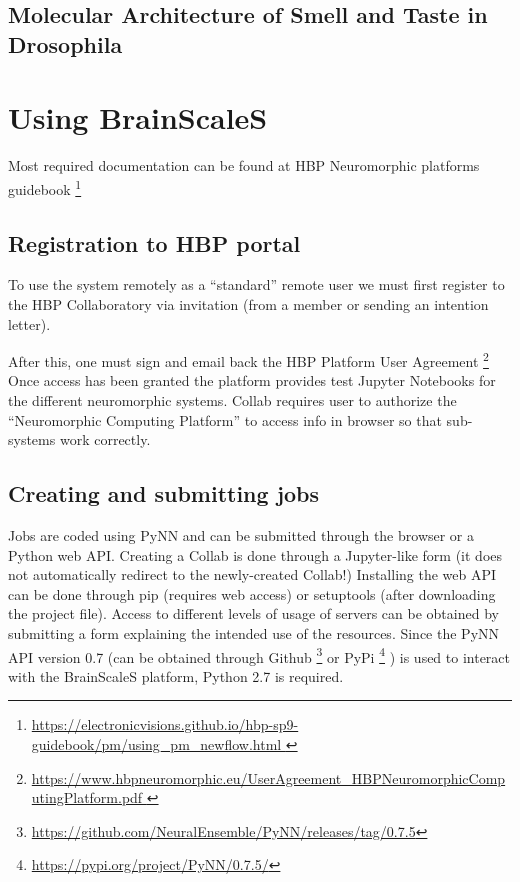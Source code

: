 \documentclass[11pt,a4paper]{article}
\begin{document}
   \subsection{Molecular Architecture of Smell and Taste in Drosophila}



  \section{Using BrainScaleS}
 
  Most required documentation can be found at HBP Neuromorphic platforms guidebook
    \footnote{
    \url{
      https://electronicvisions.github.io/hbp-sp9-guidebook/pm/using_pm_newflow.html
    }
  }
 
  \subsection{Registration to HBP portal}
  To use the system remotely as a ``standard'' remote user we must first register to the HBP Collaboratory via invitation (from a member or sending an intention letter).
 
  After this, one must sign and email back the HBP Platform User  Agreement
  \footnote{
    \url{
      https://www.hbpneuromorphic.eu/UserAgreement_HBPNeuromorphicComputingPlatform.pdf
    }
  }
  Once access has been granted the platform provides test Jupyter Notebooks for the different neuromorphic systems. 
  Collab requires user to authorize the ``Neuromorphic Computing Platform'' to access info in browser so that sub-systems work correctly.
 
  \subsection{Creating and submitting jobs}
  Jobs are coded using PyNN and can be submitted through the browser or a Python web API.
  Creating a Collab is done through a Jupyter-like form (it does not automatically redirect to the newly-created Collab!)
  Installing the web API can be done through pip (requires web access) or setuptools (after downloading the project file).
  Access to different levels of usage of servers can be obtained by submitting a form explaining the intended use of the resources.
  Since the PyNN API version 0.7 (can be obtained through Github
    \footnote{\url{https://github.com/NeuralEnsemble/PyNN/releases/tag/0.7.5}} 
  or PyPi 
     \footnote{\url{https://pypi.org/project/PyNN/0.7.5/}}
  ) is used to interact with the BrainScaleS platform, Python 2.7 is required.
 
\end{document}
